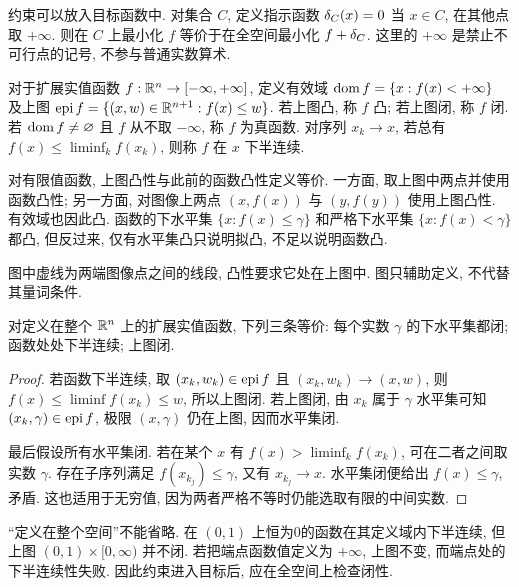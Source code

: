 约束可以放入目标函数中. 对集合 $C$, 定义指示函数 $\delta_{C}(x)=0$ 当 $x\in C$, 在其他点取 $+\infty$. 则在 $C$ 上最小化 $f$ 等价于在全空间最小化 $f+\delta_{C}$. 这里的 $+\infty$ 是禁止不可行点的记号, 不参与普通实数算术.

\begin{definition}
对于扩展实值函数 $f:\mathbb R^n\to[-\infty,+\infty]$, 定义有效域 $\operatorname{dom} f=\{x:f(x)<+\infty\}$ 及上图
$\operatorname{epi} f=\{(x,w)\in\mathbb R^{n+1}:f(x)\le w\}$. 若上图凸, 称 $f$ 凸; 若上图闭, 称 $f$ 闭. 若 $\operatorname{dom} f\ne\varnothing$ 且 $f$ 从不取 $-\infty$, 称 $f$ 为真函数. 对序列 $x_k\to x$, 若总有 $f(x)\le\liminf_kf(x_k)$, 则称 $f$ 在 $x$ 下半连续.
\end{definition}
对有限值函数, 上图凸性与此前的函数凸性定义等价. 一方面, 取上图中两点并使用函数凸性; 另一方面, 对图像上两点 $(x,f(x))$ 与 $(y,f(y))$ 使用上图凸性. 有效域也因此凸. 函数的下水平集 $\{x:f(x)\le\gamma\}$ 和严格下水平集 $\{x:f(x)<\gamma\}$ 都凸, 但反过来, 仅有水平集凸只说明拟凸, 不足以说明函数凸.

\begin{center}
\end{center}
图中虚线为两端图像点之间的线段, 凸性要求它处在上图中. 图只辅助定义, 不代替其量词条件.

\begin{theorem}\label{thm:lsc}
对定义在整个 $\mathbb R^n$ 上的扩展实值函数, 下列三条等价: 每个实数 $\gamma$ 的下水平集都闭; 函数处处下半连续; 上图闭.
\end{theorem}
\begin{proof}
若函数下半连续, 取 $(x_k,w_k)\in\operatorname{epi} f$ 且 $(x_k,w_k)\to(x,w)$, 则 $f(x)\le\liminf f(x_k)\le w$, 所以上图闭. 若上图闭, 由 $x_k$ 属于 $\gamma$ 水平集可知 $(x_k,\gamma)\in\operatorname{epi} f$, 极限 $(x,\gamma)$ 仍在上图, 因而水平集闭.

最后假设所有水平集闭. 若在某个 $x$ 有 $f(x)>\liminf_kf(x_k)$, 可在二者之间取实数 $\gamma$. 存在子序列满足 $f(x_{k_j})\le\gamma$, 又有 $x_{k_j}\to x$. 水平集闭便给出 $f(x)\le\gamma$, 矛盾. 这也适用于无穷值, 因为两者严格不等时仍能选取有限的中间实数.
\end{proof}
“定义在整个空间”不能省略. 在 $(0,1)$ 上恒为0的函数在其定义域内下半连续, 但上图 $(0,1)\times[0,\infty)$ 并不闭. 若把端点函数值定义为 $+\infty$, 上图不变, 而端点处的下半连续性失败. 因此约束进入目标后, 应在全空间上检查闭性.

